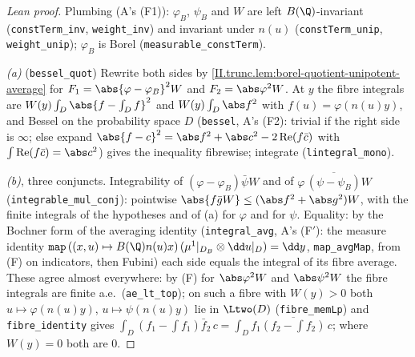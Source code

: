 \begin{proof}[Lean proof]
Plumbing (A's (F1)): $\varphi_B$, $\psi_B$ and $W$ are left $B(\Q)$-invariant (\texttt{constTerm\_inv}, \texttt{weight\_inv}) and invariant under $n(u)$ (\texttt{constTerm\_unip}, \texttt{weight\_unip}); $\varphi_B$ is Borel (\texttt{measurable\_constTerm}).

\emph{(a)} (\texttt{bessel\_quot}) Rewrite both sides by \cref{II.trunc.lem:borel-quotient-unipotent-average} for $F_1=\abs{\varphi-\varphi_B}^2W$ and $F_2=\abs\varphi^2W$. At $y$ the fibre integrals are $W(y)\int_D\abs{f-\int_Df}^2$ and $W(y)\int_D\abs f^2$ with $f(u)=\varphi(n(u)y)$, and Bessel on the probability space $D$ (\texttt{bessel}, A's (F2): trivial if the right side is $\infty$; else expand $\abs{f-c}^2=\abs f^2+\abs c^2-2\operatorname{Re}(f\bar c)$ with $\int\operatorname{Re}(f\bar c)=\abs c^2$) gives the inequality fibrewise; integrate (\texttt{lintegral\_mono}).

\emph{(b)}, three conjuncts. Integrability of $(\varphi-\varphi_B)\bar\psi W$ and of $\varphi\,\overline{(\psi-\psi_B)}W$ (\texttt{integrable\_mul\_conj}): pointwise $\abs{f\bar gW}\le(\abs f^2+\abs g^2)W$, with the finite integrals of the hypotheses and of (a) for $\varphi$ and for $\psi$. Equality: by the Bochner form of the averaging identity (\texttt{integral\_avg}, A's (F$'$): the measure identity $\texttt{map}\,((x,u)\mapsto B(\Q)n(u)x)\,(\mu^1|_{D_B}\otimes\dd u|_D)=\dd y$, \texttt{map\_avgMap}, from (F) on indicators, then Fubini) each side equals the integral of its fibre average. These agree almost everywhere: by (F) for $\abs\varphi^2W$ and $\abs\psi^2W$ the fibre integrals are finite a.e.\ (\texttt{ae\_lt\_top}); on such a fibre with $W(y)>0$ both $u\mapsto\varphi(n(u)y)$, $u\mapsto\psi(n(u)y)$ lie in $\Ltwo(D)$ (\texttt{fibre\_memLp}) and \texttt{fibre\_identity} gives $\int_D(f_1-\int f_1)\bar f_2\,c=\int_Df_1\overline{(f_2-\int f_2)}\,c$; where $W(y)=0$ both are $0$.
\end{proof}

